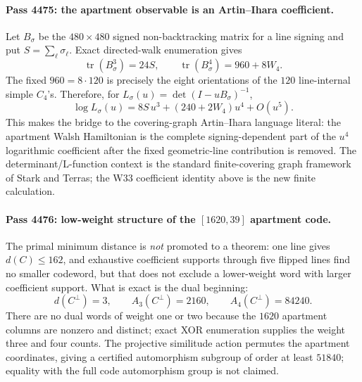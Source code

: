 \paragraph{Pass 4475: the apartment observable is an Artin--Ihara coefficient.}
Let $B_\sigma$ be the $480\times480$ signed non-backtracking matrix for a line
signing and put $S=\sum_\ell\sigma_\ell$.  Exact directed-walk enumeration gives
\begin{equation}
 \boxed{\operatorname{tr}(B_\sigma^3)=24S,}
 \qquad
 \boxed{\operatorname{tr}(B_\sigma^4)=960+8W_4.}
 \label{eq:pass4475-hashimoto-traces}
\end{equation}
The fixed $960=8\cdot120$ is precisely the eight orientations of the $120$
line-internal simple $C_4$'s.  Therefore, for
$L_\sigma(u)=\det(I-uB_\sigma)^{-1}$,
\begin{equation}
 \boxed{
 \log L_\sigma(u)
 =8S\,u^3+(240+2W_4)u^4+O(u^5).}
 \label{eq:pass4475-artin-ihara}
\end{equation}
This makes the bridge to the covering-graph Artin--Ihara language literal: the
apartment Walsh Hamiltonian is the complete signing-dependent part of the
$u^4$ logarithmic coefficient after the fixed geometric-line contribution is
removed.  The determinant/L-function context is the standard finite-covering
graph framework of Stark and Terras; the W33 coefficient identity above is the
new finite calculation.

\paragraph{Pass 4476: low-weight structure of the $[1620,39]$ apartment code.}
The primal minimum distance is \emph{not} promoted to a theorem: one line gives
$d(C)\le162$, and exhaustive coefficient supports through five flipped lines
find no smaller codeword, but that does not exclude a lower-weight word with
larger coefficient support.  What is exact is the dual beginning:
\begin{equation}
 \boxed{d(C^\perp)=3,\qquad A_3(C^\perp)=2160,\qquad
 A_4(C^\perp)=84240.}
 \label{eq:pass4476-dual-lowweights}
\end{equation}
There are no dual words of weight one or two because the $1620$ apartment
columns are nonzero and distinct; exact XOR enumeration supplies the weight
three and four counts.  The projective similitude action permutes the apartment
coordinates, giving a certified automorphism subgroup of order at least
$51840$; equality with the full code automorphism group is not claimed.


